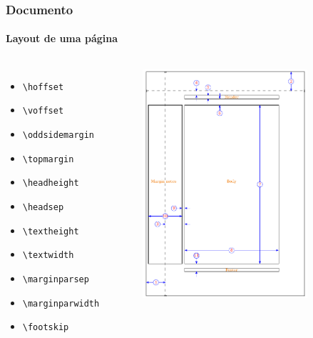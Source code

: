 \begin{frame}[fragile]
\frametitle{Documento}
\framesubtitle{Layout de uma página}
  \scriptsize
  \begin{columns}[c]
  \begin{itemize}
  \item \verb|\hoffset|
  \item \verb|\voffset|
  \item \verb|\oddsidemargin|
  \item \verb|\topmargin|
  \item \verb|\headheight|
  \item \verb|\headsep|
  \item \verb|\textheight| 
  \item \verb|\textwidth|
  \item \verb|\marginparsep|
  \item \verb|\marginparwidth|
  \item \verb|\footskip|
  \end{itemize}
  \vspace{-0.5cm}
\begin{figure}[h!]
  \centering
  \label{fig:Latex_layout}
    \includegraphics[width=0.85\textwidth]{figures/Latex_layout.pdf}
\end{figure}
  \end{columns}
\end{frame}


